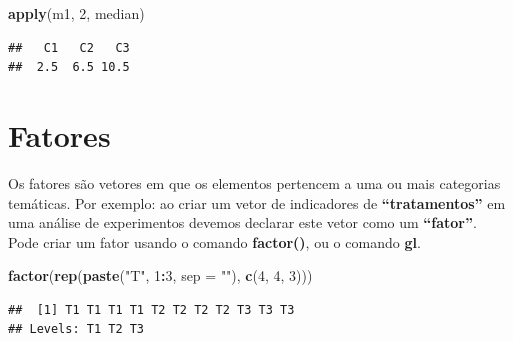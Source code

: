 \documentclass[]{book}
\newenvironment{Shaded}{\begin{snugshade}}{\end{snugshade}}
\newcommand{\DataTypeTok}[1]{\textcolor[rgb]{0.13,0.29,0.53}{#1}}
\newcommand{\DecValTok}[1]{\textcolor[rgb]{0.00,0.00,0.81}{#1}}
\newcommand{\KeywordTok}[1]{\textcolor[rgb]{0.13,0.29,0.53}{\textbf{#1}}}
\newcommand{\NormalTok}[1]{#1}
\newcommand{\OperatorTok}[1]{\textcolor[rgb]{0.81,0.36,0.00}{\textbf{#1}}}
\newcommand{\StringTok}[1]{\textcolor[rgb]{0.31,0.60,0.02}{#1}}
\begin{document}
\begin{Shaded}
\begin{Highlighting}[]
 \KeywordTok{apply}\NormalTok{(m1, }\DecValTok{2}\NormalTok{, median)}
\end{Highlighting}
\end{Shaded}

\begin{verbatim}
##   C1   C2   C3 
##  2.5  6.5 10.5
\end{verbatim}

\hypertarget{fatores}{%
\section{Fatores}\label{fatores}}

Os fatores são vetores em que os elementos pertencem a uma ou mais categorias temáticas. Por exemplo: ao criar um vetor de indicadores de \textbf{``tratamentos''} em uma análise de experimentos devemos declarar este vetor como um \textbf{``fator''}.
Pode criar um fator usando o comando \textbf{factor()}, ou o comando \textbf{gl}.

\begin{Shaded}
\begin{Highlighting}[]
\KeywordTok{factor}\NormalTok{(}\KeywordTok{rep}\NormalTok{(}\KeywordTok{paste}\NormalTok{(}\StringTok{"T"}\NormalTok{, }\DecValTok{1}\OperatorTok{:}\DecValTok{3}\NormalTok{, }\DataTypeTok{sep =} \StringTok{""}\NormalTok{), }\KeywordTok{c}\NormalTok{(}\DecValTok{4}\NormalTok{, }\DecValTok{4}\NormalTok{, }\DecValTok{3}\NormalTok{)))}
\end{Highlighting}
\end{Shaded}

\begin{verbatim}
##  [1] T1 T1 T1 T1 T2 T2 T2 T2 T3 T3 T3
## Levels: T1 T2 T3
\end{verbatim}
\end{document}
